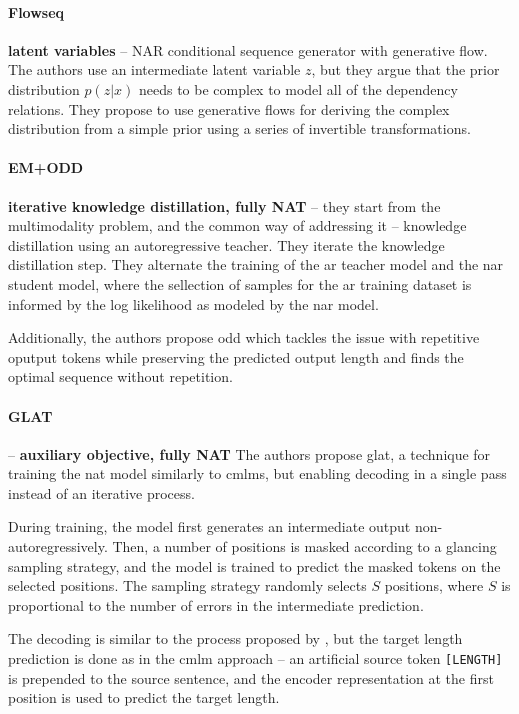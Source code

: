 \paragraph{Flowseq} \textbf{latent variables} \citep{ma-etal-2019-flowseq} --
NAR conditional sequence generator with generative flow. The authors use an
intermediate latent variable $z$, but they argue that the prior distribution
$p(z|x)$ needs to be complex to model all of the dependency relations. They
propose to use generative flows \citep{rezende2015variational} for deriving the
complex distribution from a simple prior using a series of invertible
transformations. 

\paragraph{EM+ODD} \textbf{iterative knowledge distillation, fully NAT}
\citep{sun2020em} -- they start from the multimodality problem, and the common
way of addressing it -- knowledge distillation using an autoregressive
teacher. They iterate the knowledge distillation step. They alternate the
training of the \ac{ar} teacher model and the \ac{nar} student model, where the
sellection of samples for the \ac{ar} training dataset is informed by the log
likelihood as modeled by the \ac{nar} model.

Additionally, the authors propose \acf{odd} which tackles the issue with
repetitive oputput tokens while preserving the predicted output length and
finds the optimal sequence without repetition.


\paragraph{GLAT} \citep{qian2020glancing} -- \textbf{auxiliary objective, fully
  NAT} The authors propose \acf{glat}, a technique for training the \ac{nat}
model similarly to \acp{cmlm}, but enabling decoding in a single pass instead
of an iterative process.

During training, the model first generates an intermediate output
non-autoregressively. Then, a number of positions is masked according to a
glancing sampling strategy, and the model is trained to predict the masked
tokens on the selected positions.  The sampling strategy
randomly selects $S$ positions, where $S$ is proportional to the number of
errors in the intermediate prediction.

The decoding is similar to the process proposed by
\citet{gu2017nonautoregressive}, but the target length prediction is done as in
the \ac{cmlm} approach -- an artificial source token \texttt{[LENGTH]} is
prepended to the source sentence, and the encoder representation at the first
position is used to predict the target length.


